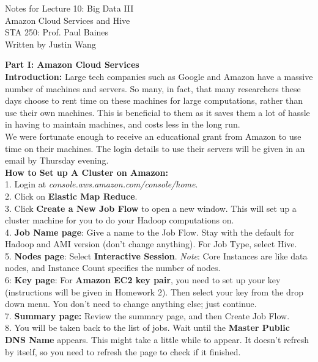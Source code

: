 \documentclass[12pt]{article}
\newcommand{\discussion}{Notes for Lecture 10: Big Data III}
\newcommand{\thecourse}{Amazon Cloud Services and Hive}
\newcommand{\prof}{STA 250: Prof. Paul Baines}
\newcommand{\name}{Written by Justin Wang}
\begin{document}
\begin{center}
{\LARGE \discussion} \\
{\large \thecourse} \\
{\small \prof} \\
{\small \name} \\ 
\end{center}
\vspace{6 mm}

{\bf Part I: Amazon Cloud Services} \\

{\bf Introduction:} Large tech companies such as Google and Amazon have a massive number of machines and servers. So many, in fact, that many researchers these days choose to rent time on these machines for large computations, rather than use their own machines. This is beneficial to them as it saves them a lot of hassle in having to maintain machines, and costs less in the long run. \\

We were fortunate enough to receive an educational grant from Amazon to use time on their machines. The login details to use their servers will be given in an email by Thursday evening. \\

{\bf How to Set up A Cluster on Amazon:} \\

1. Login at \emph{console.aws.amazon.com/console/home}. \\
2. Click on {\bf Elastic Map Reduce}. \\
3. Click {\bf Create a New Job Flow} to open a new window. This will set up a cluster machine for you to do your Hadoop computations on. \\
4. {\bf Job Name page}: Give a name to the Job Flow. Stay with the default for Hadoop and AMI version (don't change anything). For Job Type, select Hive. \\
5. {\bf Nodes page}: Select {\bf Interactive Session}. \emph{Note}: Core Instances are like data nodes, and Instance Count specifies the number of nodes. \\
6: {\bf Key page}: For {\bf Amazon EC2 key pair}, you need to set up your key (instructions will be given in Homework 2). Then select your key from the drop down menu. You don't need to change anything else; just continue. \\
7. {\bf Summary page:} Review the summary page, and then Create Job Flow. \\
8. You will be taken back to the list of jobs. Wait until the {\bf Master Public DNS Name} appears. This might take a little while to appear. It doesn't refresh by itself, so you need to refresh the page to check if it finished. \\\\
\end{document}
